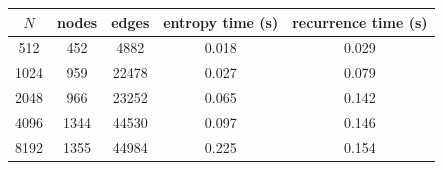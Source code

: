 \begin{tabular}{ccccc}
\toprule
$N$ & nodes & edges & entropy time (s) & recurrence time (s) \\
\midrule
512 & 452 & 4882 & 0.018 & 0.029 \\
1024 & 959 & 22478 & 0.027 & 0.079 \\
2048 & 966 & 23252 & 0.065 & 0.142 \\
4096 & 1344 & 44530 & 0.097 & 0.146 \\
8192 & 1355 & 44984 & 0.225 & 0.154 \\
\bottomrule
\end{tabular}
